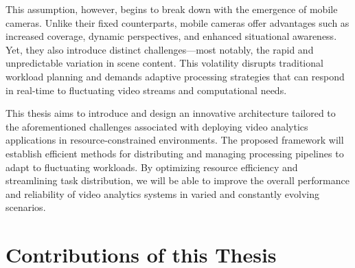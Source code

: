 This assumption, however, begins to break down with the emergence of mobile cameras. Unlike their fixed counterparts, mobile cameras offer advantages such as increased coverage, dynamic perspectives, and enhanced situational awareness. Yet, they also introduce distinct challenges—most notably, the rapid and unpredictable variation in scene content. This volatility disrupts traditional workload planning and demands adaptive processing strategies that can respond in real-time to fluctuating video streams and computational needs.



This thesis aims to introduce and design an innovative architecture tailored to the aforementioned challenges associated with deploying video analytics applications in resource-constrained environments. The proposed framework will establish efficient methods for distributing and managing processing pipelines to adapt to fluctuating workloads. By optimizing resource efficiency and streamlining task distribution, we will be able to improve the overall performance and reliability of video analytics systems in varied and constantly evolving scenarios.

\section{Contributions of this Thesis}

